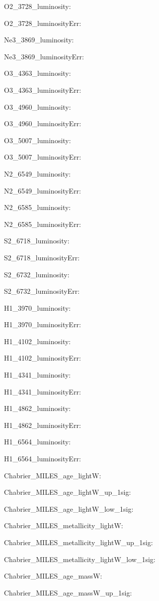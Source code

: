 \item O2\_3728\_luminosity: 
\item O2\_3728\_luminosityErr: 
\item Ne3\_3869\_luminosity: 
\item Ne3\_3869\_luminosityErr: 
\item O3\_4363\_luminosity: 
\item O3\_4363\_luminosityErr: 
\item O3\_4960\_luminosity: 
\item O3\_4960\_luminosityErr: 
\item O3\_5007\_luminosity: 
\item O3\_5007\_luminosityErr: 
\item N2\_6549\_luminosity: 
\item N2\_6549\_luminosityErr: 
\item N2\_6585\_luminosity: 
\item N2\_6585\_luminosityErr: 
\item S2\_6718\_luminosity: 
\item S2\_6718\_luminosityErr: 
\item S2\_6732\_luminosity: 
\item S2\_6732\_luminosityErr: 
\item H1\_3970\_luminosity: 
\item H1\_3970\_luminosityErr: 
\item H1\_4102\_luminosity: 
\item H1\_4102\_luminosityErr: 
\item H1\_4341\_luminosity: 
\item H1\_4341\_luminosityErr: 
\item H1\_4862\_luminosity: 
\item H1\_4862\_luminosityErr: 
\item H1\_6564\_luminosity: 
\item H1\_6564\_luminosityErr: 
\item Chabrier\_MILES\_age\_lightW: 
\item Chabrier\_MILES\_age\_lightW\_up\_1sig: 
\item Chabrier\_MILES\_age\_lightW\_low\_1sig: 
\item Chabrier\_MILES\_metallicity\_lightW: 
\item Chabrier\_MILES\_metallicity\_lightW\_up\_1sig: 
\item Chabrier\_MILES\_metallicity\_lightW\_low\_1sig: 
\item Chabrier\_MILES\_age\_massW: 
\item Chabrier\_MILES\_age\_massW\_up\_1sig: 
